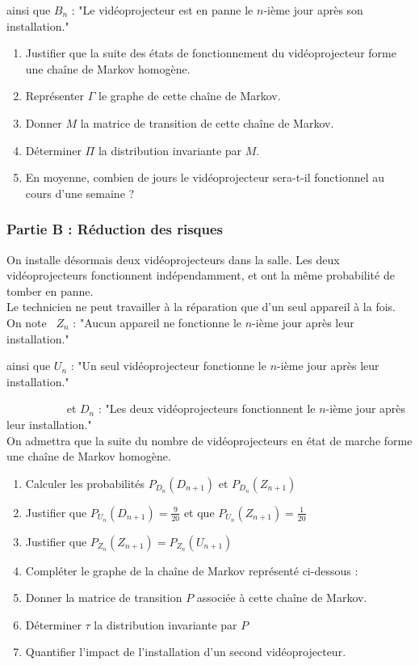 \documentclass[oneside,12pt]{article}          %
\begin{document}
ainsi que  $B_n$ : "Le vidéoprojecteur est en panne le $n$-ième jour après son installation."

\begin{enumerate}
    \item Justifier que la suite des états de fonctionnement du vidéoprojecteur forme une chaîne de Markov homogène.
    \item Représenter $\Gamma$ le graphe de cette chaîne de Markov.
    \item Donner $M$ la matrice de transition de cette chaîne de Markov.
    \item Déterminer $\Pi$ la distribution invariante par $M$.
    \item En moyenne, combien de jours le vidéoprojecteur sera-t-il fonctionnel au cours d'une semaine ?
\end{enumerate}

\subsubsection*{Partie B : Réduction des risques}

On installe désormais deux vidéoprojecteurs dans la salle. Les deux vidéoprojecteurs fonctionnent indépendamment, et ont la même probabilité de tomber en panne.\\[5pt]
Le technicien ne peut travailler à la réparation que d'un seul appareil à la fois.\\[5pt]
On note ~$Z_n$ : "Aucun appareil ne fonctionne le $n$-ième jour après leur installation."

ainsi que  $U_n$ : "Un seul vidéoprojecteur fonctionne le $n$-ième jour après leur installation."

~~~~~~~~~~ et $D_n$ : "Les deux vidéoprojecteurs fonctionnent le $n$-ième jour après leur installation."\\[5pt]
On admettra que la suite du nombre de vidéoprojecteurs en état de marche forme une chaîne de Markov homogène.

\begin{enumerate}
    \item Calculer les probabilités $P_{D_n}(D_{n+1})$ et $P_{D_n}(Z_{n+1})$
    \item Justifier que $P_{U_n}(D_{n+1})=\frac{9}{20}$ et que $P_{U_n}(Z_{n+1})=\frac{1}{20}$
    \item Justifier que $P_{Z_n}(Z_{n+1})=P_{Z_n}(U_{n+1})$
    \item Compléter le graphe de la chaîne de Markov représenté ci-dessous :
    \item Donner la matrice de transition $P$ associée à cette chaîne de Markov.
    \item Déterminer $\tau$ la distribution invariante par $P$
    \item Quantifier l'impact de l'installation d'un second vidéoprojecteur.
\end{enumerate}
\end{document}
